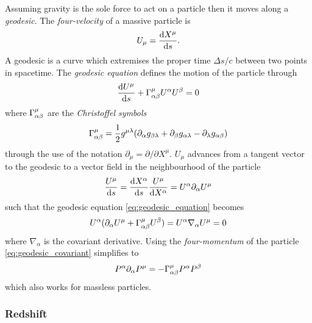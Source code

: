 Assuming gravity is the sole force to act on a particle then it moves along a \emph{geodesic}.
The \emph{four-velocity} of a massive particle is
%
\begin{equation}
	U_{\mu}
	= \dv{X^{\mu}}{s}.
\end{equation}
%
A geodesic is a curve which extremises the proper time \(\Delta s/c\) between two points in spacetime. The \emph{geodesic equation} defines the motion of the particle through
%
\begin{equation}\label{eq:geodesic_equation}
	\dv{U^{\mu}}{s} + \Gamma^{\mu}_{\alpha\beta} U^{\alpha} U^{\beta}
	= 0
\end{equation}
%
where \(\Gamma^{\mu}_{\alpha\beta}\) are the \emph{Christoffel symbols}
%
\begin{equation}
	\Gamma^{\mu}_{\alpha\beta}
	= \frac{1}{2} g^{\mu\lambda}
	(\partial_{\alpha}g_{\beta\lambda}
	+ \partial_{\beta}g_{\alpha\lambda}
	- \partial_{\lambda}g_{\alpha\beta})
\end{equation}
%
through the use of the notation \(\partial_{\mu} = \partial/\partial X^{\mu}\).
\(U_{\mu}\) advances from a tangent vector to the geodesic to a vector field in the neighbourhood of the particle
%
\begin{equation}
	\frac{U^{\mu}}{\dd{s}}
	= \dv{X^{\alpha}}{s} \frac{U^{\mu}}{\dd{X^{\alpha}}}
	= U^{\alpha} \partial_{\alpha} U^{\mu}
\end{equation}
%
such that the geodesic equation \cref{eq:geodesic_equation} becomes
%
\begin{equation}\label{eq:geodesic_covariant}
	U^{\alpha} (\partial_{\alpha} U^{\mu} + \Gamma^{\mu}_{\alpha\beta} U^{\beta})
	= U^{\alpha} \nabla_{\alpha} U^{\mu}
	= 0
\end{equation}
%
where \(\nabla_{\alpha}\) is the covariant derivative.
Using the \emph{four-momentum} of the particle \cref{eq:geodesic_covariant} simplifies to
%
\begin{equation}
	P^{\alpha} \partial_{\alpha} P^{\mu}
	= -\Gamma^{\mu}_{\alpha\beta} P^{\alpha} P^{\beta}
\end{equation}
%
which also works for massless particles.

\subsubsection{Redshift}

